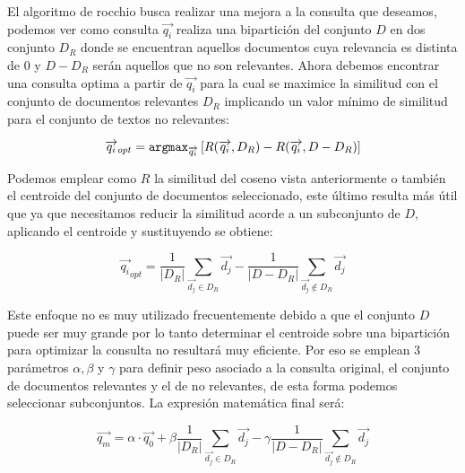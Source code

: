 \documentclass[runningheads,a4paper]{llncs}
\begin{document}
El algoritmo de rocchio busca realizar una mejora a la consulta que deseamos, podemos ver como consulta $\overrightarrow{q_i}$ realiza una bipartición del conjunto $D$ en dos conjunto $D_R$ donde se encuentran aquellos documentos cuya relevancia es distinta de 0 y $D - D_R$ serán aquellos que no son relevantes. Ahora debemos encontrar una consulta optima a partir de $\overrightarrow{q_i}$ para la cual se maximice la similitud con el conjunto de documentos relevantes $D_R$ implicando un valor mínimo de similitud para el conjunto de textos no relevantes:

\begin{equation}
	\overrightarrow{{q_i}}_{opt} = \verb*|argmax|_{\overrightarrow{q_i}} \left[ R(\overrightarrow{q_i}, D_R) - R(\overrightarrow{q_i}, D - D_R) \right] 
\end{equation}

Podemos emplear como $R$ la similitud del coseno vista anteriormente o también el centroide del conjunto de documentos seleccionado, este último resulta más útil que ya que necesitamos reducir la similitud acorde a un subconjunto de $D$, aplicando el centroide y sustituyendo se obtiene:

\begin{equation}
	\overrightarrow{{q_i}}_{opt} = \frac{1}{|D_R|} \sum_{\overrightarrow{d_j} \in D_R} \overrightarrow{d_j} - \frac{1}{|D - D_R|} \sum_{\overrightarrow{d_j} \notin D_R} \overrightarrow{d_j} 
\end{equation}

Este enfoque no es muy utilizado frecuentemente debido a que el conjunto $D$ puede ser muy grande por lo tanto determinar el centroide sobre una bipartición para optimizar la consulta no resultará muy eficiente. Por eso se emplean 3 parámetros $\alpha, \beta $ y $\gamma$  para definir peso asociado a la consulta original, el conjunto de documentos relevantes y el de no relevantes, de esta forma podemos seleccionar subconjuntos. La expresión matemática final será:

\begin{equation}
	\overrightarrow{q_m} = \alpha · \overrightarrow{q_0} + \beta \frac{1}{|D_R|} \sum_{\overrightarrow{d_j} \in D_R} \overrightarrow{d_j} - \gamma \frac{1}{|D - D_R|} \sum_{\overrightarrow{d_j} \notin D_R} \overrightarrow{d_j}
\end{equation}
\end{document}

